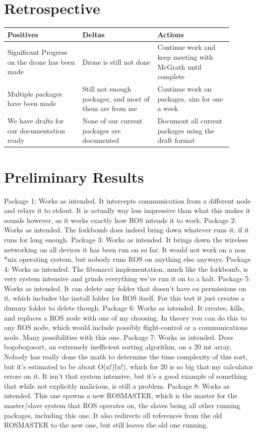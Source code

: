 \documentclass[IEEEtran,letterpaper,10pt,notitlepage,draftclsnofoot,onecolumn]{article}
\begin{document}
\section{Retrospective}

\begin{center}
\begin{tabular}{ |p{0.3\linewidth}|p{0.3\linewidth}|p{0.3\linewidth}| }
 \hline
 \centering Positives &
 \centering Deltas &
 \centering Actions \tabularnewline
 \hline
 Significant Progress on the drone has been made &
 Drone is still not done &
 Continue work and keep meeting with McGrath until complete \tabularnewline
 \hline
 Multiple packages have been made &
 Still not enough packages, and most of them are from me &
 Continue work on packages, aim for one a week \tabularnewline
 \hline
 We have drafts for our documentation ready &
 None of our current packages are documented &
 Document all current packages using the draft format \tabularnewline
 \hline
\end{tabular}
\end{center}

\section{Preliminary Results}
Package 1:
Works as intended. It intercepts communication from a different node and relays it to stdout. It is actually way less impressive than what this makes it sounds however, as it works exactly how ROS intends it to work.
Package 2:
Works as intended. The forkbomb does indeed bring down whatever runs it, if it runs for long enough. 
Package 3:
Works as intended. It brings down the wireless networking on all devices it has been run on so far. It would not work on a non *nix operating system, but nobody runs ROS on anything else anyways.
Package 4:
Works as intended. The fibonacci implementation, much like the forkbomb, is very system intensive and grinds everything we've run it on to a halt.
Package 5:
Works as intended. It can delete any folder that doesn't have su permissions on it, which includes the install folder for ROS itself. For this test it just creates a dummy folder to delete though.
Package 6:
Works as intended. It creates, kills, and replaces a ROS node with one of my choosing. In theory you can do this to any ROS node, which would include possibly flight-control or a communications node. 
Many possibilities with this one.
Package 7:
Works as intended. Does bogobogosort, an extremely inefficient sorting algorithm, on a 20 int array. Nobody has really done the math to determine the time complexity of this sort, but it's estimated 
to be about O(n!)\^(n!), which for 20 is so big that my calculator errors on it. It isn't that system intensive, but it's a good example of something that while not explicitly malicious, is still a problem.
Package 8:
Works as intended. This one spawns a new ROSMASTER, which is the master for the master/slave system that ROS operates on, the slaves being all other running packages, including this one. It also redirects 
all references from the old ROSMASTER to the new one, but still leaves the old one running.
\end{document}
